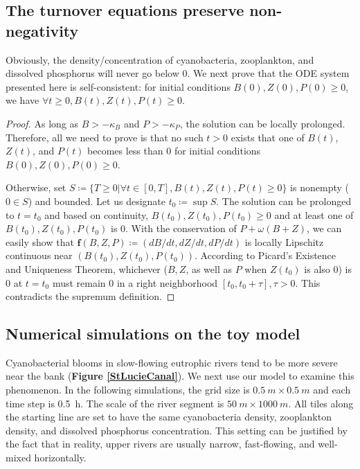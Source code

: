 \documentclass{article}
\renewcommand\vec{\mathbf}
\begin{document}
\subsection*{The turnover equations preserve non-negativity}
Obviously, the density/concentration of cyanobacteria, zooplankton, and dissolved phosphorus will never go below 0. We next prove that the ODE system presented here is self-consistent: for initial conditions $B(0), Z(0), P(0) \geq 0$, we have $\forall t \geq 0, B(t), Z(t), P(t) \geq 0$.

\begin{proof}
As long as $B > -\kappa_B$ and $P > -\kappa_P$, the solution can be locally prolonged. Therefore, all we need to prove is that no such $t > 0$ exists that one of $B(t)$, $Z(t)$, and $P(t)$ becomes less than 0 for initial conditions $B(0), Z(0), P(0) \geq 0$.

Otherwise, set $S \coloneqq \{T \geq 0|\forall t \in [0, T], B(t), Z(t), P(t) \geq 0\}$ is nonempty ($0 \in S$) and bounded. Let us designate $t_0 \coloneqq \sup S$. The solution can be prolonged to $t = t_0$ and based on continuity, $B(t_0), Z(t_0), P(t_0) \geq 0$ and at least one of $B(t_0), Z(t_0), P(t_0)$ is 0. With the conservation of $P + \omega(B + Z)$, we can easily show that $\vec{f}(B, Z, P) \coloneqq (dB/dt, dZ/dt, dP/dt)$ is locally Lipschitz continuous near $(B(t_0), Z(t_0), P(t_0))$. According to Picard's Existence and Uniqueness Theorem, whichever ($B, Z$, as well as $P$ when $Z(t_0)$ is also 0) is 0 at $t = t_0$ must remain 0 in a right neighborhood $[t_0, t_0 + \tau], \tau > 0$. This contradicts the supremum definition.
\end{proof}

\subsection*{Numerical simulations on the toy model}
Cyanobacterial blooms in slow-flowing eutrophic rivers tend to be more severe near the bank (\textbf{Figure \ref{StLucieCanal}}). We next use our model to examine this phenomenon. In the following simulations, the grid size is $\SI{0.5}{m} \times \SI{0.5}{m}$ and each time step is \SI{0.5}{h}. The scale of the river segment is $\SI{50}{m} \times \SI{1000}{m}$. All tiles along the starting line are set to have the same cyanobacteria density, zooplankton density, and dissolved phosphorus concentration. This setting can be justified by the fact that in reality, upper rivers are usually narrow, fast-flowing, and well-mixed horizontally.
\end{document}
